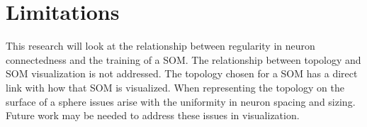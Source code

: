 \section{Limitations}
This research will look at the relationship between regularity in neuron connectedness
and the training of a SOM. The relationship between topology and SOM visualization is not
addressed. The topology chosen for a SOM has a direct link with how that SOM is
visualized.  When representing the topology on the surface of a sphere issues
arise with the uniformity in neuron spacing and sizing.  Future work may be
needed to address these issues in visualization.









